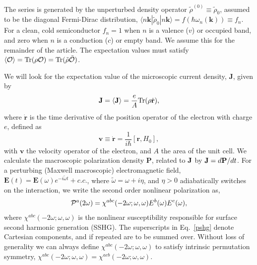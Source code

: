 \documentclass[floatfix,prb,aps,superscriptaddress,11pt,preprint,letterpaper]{revtex4}
\def\chon{black}
\begin{document}
The series is generated by the unperturbed density operator $\tilde{\rho}
^{(0)}\equiv \tilde{\rho}_{0}$, assumed to be the diagonal Fermi-Dirac distribution, 
$\langle n\mathbf{k}|\tilde{\rho}_{0}|n\mathbf{k}\rangle=f(\hbar \omega_{n}(\mathbf{k}))\equiv f_{n}$. For a
clean, cold semiconductor $f_{n}=1$ {\color{\chon} when} $n$ {\color{\chon} is} a valence ($v$) or
occupied band, and zero {\color{\chon} when} $n$ {\color{\chon} is} a conduction ($c$) or empty band.
{\color{\chon} We assume this for the remainder of the article.}
{\color{\chon} T}he expectation values must satisfy
$
\langle{\cal O}\rangle=
\mbox{Tr}({\rho}{\cal O})
=
\mbox{Tr}(\tilde{{\rho}}\tilde{\cal O})
$.  

We will look for the expectation value of the microscopic current density, 
$\mathbf{J}$, given by 
\begin{equation}
\mathbf{J}=\langle{\mathbf{J}}\rangle=\frac{e}{A}\mbox{Tr}({\rho}\dot{\mathbf{r}})
,
\label{pe}
\end{equation}
where $\dot{\mathbf{r}}$ is the time derivative of the position operator of the
electron {\color{\chon} with} charge $e$, {\color{\chon} defined as}
\begin{equation}
\mathbf{v}\equiv \dot{\mathbf{r}}=\frac{1}{i\hbar }[\mathbf{r},H_0],  
\label{mv}
\end{equation}
with $\mathbf{v}$ the velocity operator of the electron, and $A$ the
area of the unit cell. We calculate the macroscopic polarization density 
$\mathbf{P}$, related to $\mathbf{J}$ by
$\mathbf{J}=d\mathbf{P}/dt$. For a 
perturbing (Maxwell macroscopic) electromagnetic field, $\mathbf{E}(t)=
\mathbf{E}(\omega )e^{-i\tilde{\omega} t}+c.c.$,
where $\tilde\omega=\omega+i\eta $,
and $\eta >0$ {\color{\chon} adiabatically switches on} the interaction,
we write the second order nonlinear
polarization as, 
\begin{equation}
{\mathbf{\cal P}}^a(2\omega)=\chi ^{abc}(-2\omega;\omega,\omega)E^{b}(\omega)E^{c}(\omega),  
\label{pshg}
\end{equation}
where $\chi^{abc}(-2\omega ;\omega ,\omega )$ is the nonlinear
susceptibility responsible {\color{\chon} for} surface second harmonic generation
(SSHG). 
The 
superscripts in Eq.~\eqref{pshg} denote Cartesian components, and if
repeated are to be summed over. Without loss of generality we can always
define $\chi^{abc}(-2\omega;\omega,\omega)$
 to satisfy intrinsic permutation
symmetry, 
$\chi^{abc}(-2\omega ;\omega ,\omega )=\chi ^{acb}(-2\omega ;\omega
,\omega )$.
\end{document}
